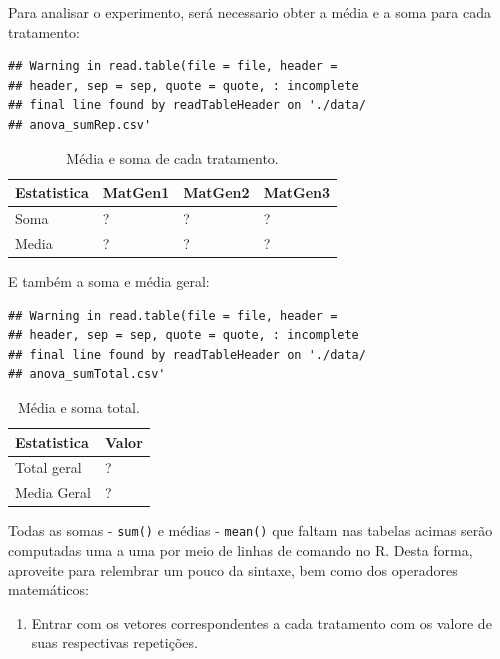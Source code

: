 \documentclass[
]{article}
\providecommand{\tightlist}{%
  \setlength{\itemsep}{0pt}\setlength{\parskip}{0pt}}
\begin{document}
Para analisar o experimento, será necessario obter a média e a soma para cada tratamento:

\begin{verbatim}
## Warning in read.table(file = file, header =
## header, sep = sep, quote = quote, : incomplete
## final line found by readTableHeader on './data/
## anova_sumRep.csv'
\end{verbatim}

\begin{table}

\caption{\label{tab:unnamed-chunk-2}Média e soma de cada tratamento.}
\centering
\begin{tabular}[t]{l|l|l|l}
\hline
Estatistica & MatGen1 & MatGen2 & MatGen3\\
\hline
Soma & ? & ? & ?\\
\hline
Media & ? & ? & ?\\
\hline
\end{tabular}
\end{table}

E também a soma e média geral:

\begin{verbatim}
## Warning in read.table(file = file, header =
## header, sep = sep, quote = quote, : incomplete
## final line found by readTableHeader on './data/
## anova_sumTotal.csv'
\end{verbatim}

\begin{table}

\caption{\label{tab:unnamed-chunk-3}Média e soma total.}
\centering
\begin{tabular}[t]{l|l}
\hline
Estatistica & Valor\\
\hline
Total geral & ?\\
\hline
Media Geral & ?\\
\hline
\end{tabular}
\end{table}

Todas as somas - \texttt{sum()} e médias - \texttt{mean()} que faltam nas tabelas acimas serão computadas uma a uma por meio de linhas de comando no R. Desta forma, aproveite para relembrar um pouco da sintaxe, bem como dos operadores matemáticos:

\begin{enumerate}
\def\labelenumi{\arabic{enumi}.}
\tightlist
\item
  Entrar com os vetores correspondentes a cada tratamento com os valore de suas respectivas repetições.
\end{enumerate}
\end{document}
